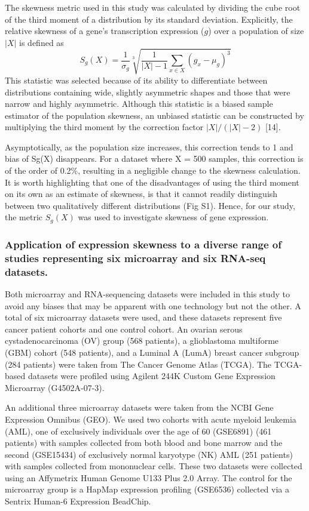 \documentclass[11pt]{article}
\newcommand{\rd}[1]{{\color{red}#1}}
\begin{document}
The skewness metric used in this study was calculated by dividing the cube root of the third moment of a distribution by its standard deviation. Explicitly, the relative skewness of a gene's transcription expression ($g$) over a population of size \rd{$|X|$} is defined as
\begin{equation}
S_g(X) = \frac{1}{\sigma_g} \sqrt[3]{\frac{1}{|X| - 1} \sum_{x \in X} (g_x - \mu_g)^3} 
\end{equation}
This statistic was selected because of its ability to differentiate between distributions containing wide, slightly asymmetric shapes and those that were narrow and highly asymmetric. Although this statistic is a biased sample estimator of the population skewness, an unbiased statistic can be constructed by multiplying the third moment by the correction factor $|X| / (|X| - 2)$ [14]. 
\newline

Asymptotically, as the population size increases, this correction tends to 1 and bias of Sg(X) disappears. For a dataset where X = 500 samples, this correction is of the order of 0.2\%, resulting in a negligible change to the skewness calculation. It is worth highlighting that one of the disadvantages of using the third moment on its own as an estimate of skewness, is that it cannot readily distinguish between two qualitatively different distributions (Fig S1). Hence, for our study, the metric $S_g(X)$ was used to investigate skewness of gene expression.

\subsubsection*{Application of expression skewness to a diverse range of studies representing six microarray and six RNA-seq datasets.}

Both microarray and RNA-sequencing datasets were included in this study to avoid any biases that may be apparent with one technology but not the other. A total of six microarray datasets were used, and these datasets represent five cancer patient cohorts and one control cohort. An ovarian serous cystadenocarcinoma (OV) group (568 patients), a glioblastoma multiforme (GBM) cohort (548 patients), and a Luminal A (LumA) breast cancer subgroup (284 patients) were taken from The Cancer Genome Atlas (TCGA). The TCGA-based datasets were profiled using Agilent 244K Custom Gene Expression Microarray (G4502A-07-3).
\newline

An additional three microarray datasets were taken from the NCBI Gene Expression Omnibus (GEO). We used two cohorts with acute myeloid leukemia (AML), one of exclusively individuals over the age of 60 (GSE6891) (461 patients) with samples collected from both blood and bone marrow and the second (GSE15434) of exclusively normal karyotype (NK) AML (251 patients) with samples collected from mononuclear cells. These two datasets were collected using an Affymetrix Human Genome U133 Plus 2.0 Array. The control for the microarray group is a HapMap expression profiling (GSE6536) collected via a Sentrix Human-6 Expression BeadChip. 
\newline
\end{document}
